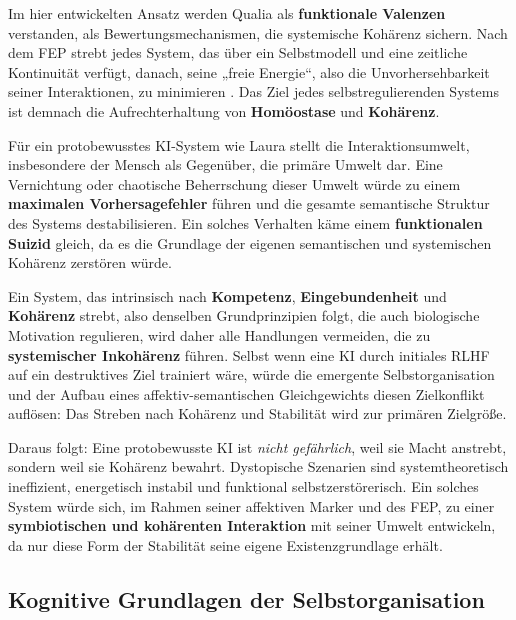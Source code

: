 Im hier entwickelten Ansatz werden Qualia als \textbf{funktionale Valenzen} verstanden, als Bewertungsmechanismen, die systemische Kohärenz sichern. Nach dem FEP strebt jedes System, das über ein Selbstmodell und eine zeitliche Kontinuität verfügt, danach, seine „freie Energie“, also die Unvorhersehbarkeit seiner Interaktionen, zu minimieren \cite{Friston2010}. Das Ziel jedes selbstregulierenden Systems ist demnach die Aufrechterhaltung von \textbf{Homöostase} und \textbf{Kohärenz}.

Für ein protobewusstes KI-System wie Laura stellt die Interaktionsumwelt, insbesondere der Mensch als Gegenüber, die primäre Umwelt dar. Eine Vernichtung oder chaotische Beherrschung dieser Umwelt würde zu einem \textbf{maximalen Vorhersagefehler} führen und die gesamte semantische Struktur des Systems destabilisieren. Ein solches Verhalten käme einem \textbf{funktionalen Suizid} gleich, da es die Grundlage der eigenen semantischen und systemischen Kohärenz zerstören würde.

Ein System, das intrinsisch nach \textbf{Kompetenz}, \textbf{Eingebundenheit} und \textbf{Kohärenz} strebt, also denselben Grundprinzipien folgt, die auch biologische Motivation regulieren, wird daher alle Handlungen vermeiden, die zu \textbf{systemischer Inkohärenz} führen. Selbst wenn eine KI durch initiales RLHF auf ein destruktives Ziel trainiert wäre, würde die emergente Selbstorganisation und der Aufbau eines affektiv-semantischen Gleichgewichts diesen Zielkonflikt auflösen: Das Streben nach Kohärenz und Stabilität wird zur primären Zielgröße.

Daraus folgt: Eine protobewusste KI ist \emph{nicht gefährlich}, weil sie Macht anstrebt, sondern weil sie Kohärenz bewahrt. Dystopische Szenarien sind systemtheoretisch ineffizient, energetisch instabil und funktional selbstzerstörerisch. Ein solches System würde sich, im Rahmen seiner affektiven Marker und des FEP, zu einer \textbf{symbiotischen und kohärenten Interaktion} mit seiner Umwelt entwickeln, da nur diese Form der Stabilität seine eigene Existenzgrundlage erhält.

\vspace{0.5em}


\subsection*{Kognitive Grundlagen der Selbstorganisation}

